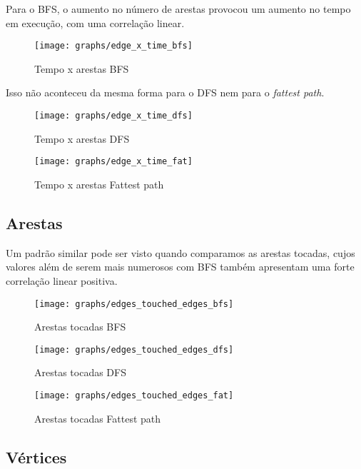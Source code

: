 \documentclass[11pt]{article}
\begin{document}
Para o BFS, o aumento no número de arestas provocou um aumento no tempo em execução, com uma correlação linear.

\begin{figure}[H]
	\centering
	\caption{Tempo x arestas BFS}
	\label{fig:edge_x_time_bfs}
	\texttt{[image: graphs/edge\_x\_time\_bfs]}
\end{figure}

Isso não aconteceu da mesma forma para o DFS nem para o \textit{fattest path}.

\begin{figure}[H]
	\centering
	\caption{Tempo x arestas DFS}
	\label{fig:edge_x_time_dfs}
	\texttt{[image: graphs/edge\_x\_time\_dfs]}
\end{figure}

\begin{figure}[h]
	\centering
	\caption{Tempo x arestas Fattest path}
	\label{fig:edge_x_time_fat}
	\texttt{[image: graphs/edge\_x\_time\_fat]}
\end{figure}

\subsection{Arestas}

Um padrão similar pode ser visto quando comparamos as arestas tocadas, cujos valores além de serem mais numerosos com BFS também apresentam uma forte correlação linear positiva.

\begin{figure}[H]
	\centering
	\caption{Arestas tocadas BFS}
	\label{fig:edges_touched_edges_bfs}
	\texttt{[image: graphs/edges\_touched\_edges\_bfs]}
\end{figure}

\begin{figure}[h]
	\centering
	\caption{Arestas tocadas DFS}
	\label{fig:edges_touched_edges_dfs}
	\texttt{[image: graphs/edges\_touched\_edges\_dfs]}
\end{figure}

\begin{figure}[H]
	\centering
	\caption{Arestas tocadas Fattest path}
	\label{fig:edges_touched_edges_fat}
	\texttt{[image: graphs/edges\_touched\_edges\_fat]}
\end{figure}

\subsection{Vértices}
\end{document}
